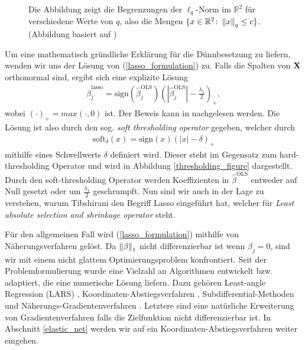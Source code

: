 \begin{figure}
\caption{Die Abbildung zeigt die Begrenzungen der $\ell_q$-Norm im $\mathbb{R}^2$ für verschiedene Werte von $q$, also die Mengen $\{x \in \mathbb{R}^2 \colon \left\lVert x \right\rVert_{q} \leq c \}$. (Abbildung basiert auf \cite{hastie_elements})}
\label{norm_figure}
\end{figure}

Um eine mathematisch gründliche Erklärung für die Dünnbesetzung zu liefern, wenden wir uns der Lösung von (\ref{lasso_formulation}) zu. Falls die Spalten von $\mathbf{X}$ orthonormal sind, ergibt sich eine explizite Lösung
\begin{align}
\hat{\beta}_j^{\text{lasso}} = \text{sign}(\hat{\beta}_j^{\text{OLS}}) \left(\left|\hat{\beta}_j^{\text{OLS}}\right| - \frac{\lambda_1}{2}\right)_{+},
\end{align}
wobei $(\cdot)_+ = max(\cdot, 0)$ ist. Der Beweis kann in \cite{murphy} nachgelesen werden. Die Lösung ist also durch den sog. \textit{soft thresholding operator} gegeben, welcher durch
\begin{align}
\text{soft}_{\delta}(x) = \text{sign}(x)(|x| - \delta)_+
\end{align}
mithilfe eines Schwellwerts $\delta$ definiert wird. Dieser steht im Gegensatz zum hard-thresholding Operator und wird in Abbildung \ref{thresholding_figure} dargestellt. Durch den soft-thresholding Operator werden Koeffizienten in $\hat{\beta}^{\text{OLS}}$ entweder auf Null gesetzt oder um $\frac{\lambda_1}{2}$ geschrumpft. Nun sind wir auch in der Lage zu verstehen, warum Tibshirani \cite{tibshirani_lasso} den Begriff Lasso eingeführt hat, welcher für \textit{Least absolute selection and shrinkage operator} steht. 

Für den allgemeinen Fall wird (\ref{lasso_formulation}) mithilfe von Näherungsverfahren gelöst. Da $\left\lVert \beta \right\rVert_1$ nicht differenzierbar ist wenn $\beta_j = 0$, sind wir mit einem nicht glattem Optimierungsproblem konfrontiert. Seit der Problemformulierung wurde eine Vielzahl an Algorithmen entwickelt bzw. adaptiert, die eine numerische Lösung liefern. Dazu gehören Least-angle Regression (LARS) \cite{efron_lars}, Koordinaten-Abstiegsverfahren \cite{friedman}, Subdifferential-Methoden und  Näherungs-Gradientenverfahren \cite{yang, vandenberghe}. Letztere sind eine natürliche Erweiterung von Gradientenverfahren falls die Zielfunktion nicht differenzierbar ist. In Abschnitt \ref{elastic_net} werden wir auf ein Koordinaten-Abstiegsverfahren weiter eingehen.

